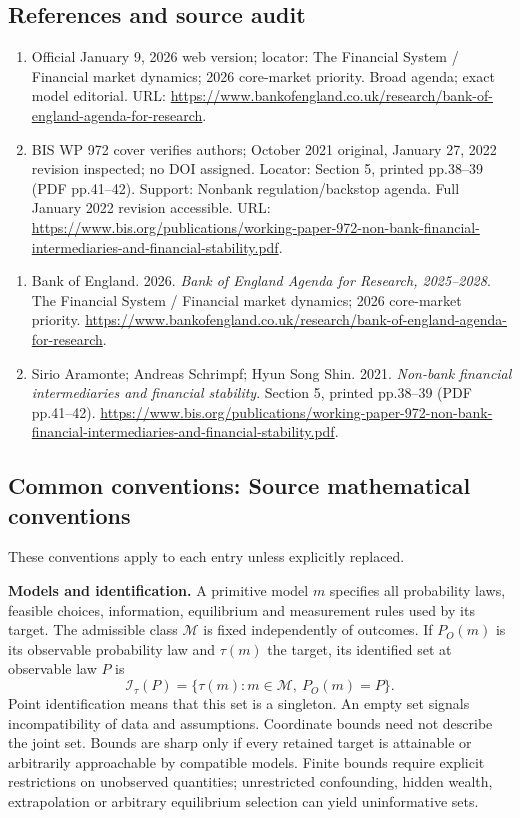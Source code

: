 \documentclass[11pt,a4paper]{article}
\begin{document}
\subsection*{References and source audit}
\begin{enumerate}
\item Official January 9, 2026 web version; locator: The Financial System / Financial market dynamics; 2026 core-market priority. Broad agenda; exact model editorial. URL: \url{https://www.bankofengland.co.uk/research/bank-of-england-agenda-for-research}.
\item BIS WP 972 cover verifies authors; October 2021 original, January 27, 2022 revision inspected; no DOI assigned. Locator: Section 5, printed pp.38--39 (PDF pp.41--42). Support: Nonbank regulation/backstop agenda. Full January 2022 revision accessible. URL: \url{https://www.bis.org/publications/working-paper-972-non-bank-financial-intermediaries-and-financial-stability.pdf}.
\end{enumerate}
\begin{enumerate}\raggedright
\item\hypertarget{definitions:source:30007599:1}{} Bank of England. 2026. \emph{Bank of England Agenda for Research, 2025–2028}. The Financial System / Financial market dynamics; 2026 core-market priority.
\url{https://www.bankofengland.co.uk/research/bank-of-england-agenda-for-research}.
\item\hypertarget{definitions:source:30007599:2}{} Sirio Aramonte; Andreas Schrimpf; Hyun Song Shin. 2021. \emph{Non-bank financial intermediaries and financial stability}. Section 5, printed pp.38--39 (PDF pp.41--42).
\url{https://www.bis.org/publications/working-paper-972-non-bank-financial-intermediaries-and-financial-stability.pdf}.
\end{enumerate}

\subsection*{Common conventions: Source mathematical conventions}

These conventions apply to each entry unless explicitly replaced.

\textbf{Models and identification.} A primitive model \(m\) specifies all probability laws, feasible choices, information, equilibrium and measurement rules used by its target. The admissible class \(\mathcal M\) is fixed independently of outcomes. If \(P_O(m)\) is its observable probability law and \(\tau(m)\) the target, its identified set at observable law \(P\) is
\[
 \mathcal I_\tau(P)=\{\tau(m):m\in\mathcal M,\ P_O(m)=P\}.
\]
Point identification means that this set is a singleton. An empty set signals incompatibility of data and assumptions. Coordinate bounds need not describe the joint set. Bounds are sharp only if every retained target is attainable or arbitrarily approachable by compatible models. Finite bounds require explicit restrictions on unobserved quantities; unrestricted confounding, hidden wealth, extrapolation or arbitrary equilibrium selection can yield uninformative sets.
\end{document}
